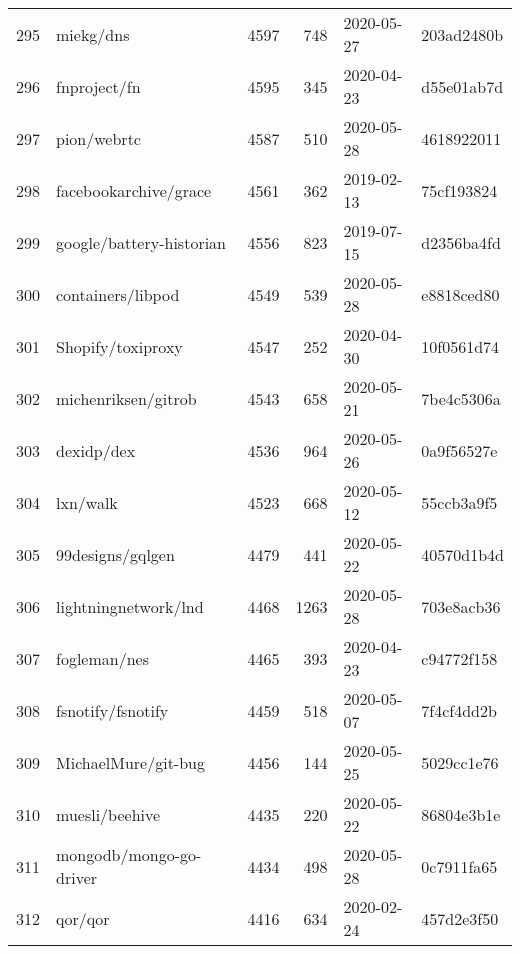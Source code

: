 \begin{longtable}{llrrll}
    295 &                                          miekg/dns &   4597 &    748 & 2020-05-27 &  203ad2480b \\
    296 &                                       fnproject/fn &   4595 &    345 & 2020-04-23 &  d55e01ab7d \\
    297 &                                        pion/webrtc &   4587 &    510 & 2020-05-28 &  4618922011 \\
    298 &                              facebookarchive/grace &   4561 &    362 & 2019-02-13 &  75cf193824 \\
    299 &                           google/battery-historian &   4556 &    823 & 2019-07-15 &  d2356ba4fd \\
    300 &                                  containers/libpod &   4549 &    539 & 2020-05-28 &  e8818ced80 \\
    301 &                                  Shopify/toxiproxy &   4547 &    252 & 2020-04-30 &  10f0561d74 \\
    302 &                                michenriksen/gitrob &   4543 &    658 & 2020-05-21 &  7be4c5306a \\
    303 &                                         dexidp/dex &   4536 &    964 & 2020-05-26 &  0a9f56527e \\
    304 &                                           lxn/walk &   4523 &    668 & 2020-05-12 &  55ccb3a9f5 \\
    305 &                                   99designs/gqlgen &   4479 &    441 & 2020-05-22 &  40570d1b4d \\
    306 &                               lightningnetwork/lnd &   4468 &   1263 & 2020-05-28 &  703e8acb36 \\
    307 &                                       fogleman/nes &   4465 &    393 & 2020-04-23 &  c94772f158 \\
    308 &                                  fsnotify/fsnotify &   4459 &    518 & 2020-05-07 &  7f4cf4dd2b \\
    309 &                                MichaelMure/git-bug &   4456 &    144 & 2020-05-25 &  5029cc1e76 \\
    310 &                                     muesli/beehive &   4435 &    220 & 2020-05-22 &  86804e3b1e \\
    311 &                            mongodb/mongo-go-driver &   4434 &    498 & 2020-05-28 &  0c7911fa65 \\
    312 &                                            qor/qor &   4416 &    634 & 2020-02-24 &  457d2e3f50 \\

\end{longtable}

